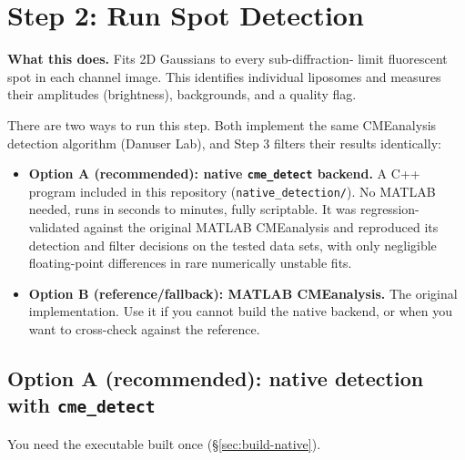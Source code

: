 \documentclass[11pt]{article}
\newcommand{\code}[1]{\texttt{#1}}
\begin{document}
\section{Step 2: Run Spot Detection}

\textbf{What this does.} Fits 2D Gaussians to every sub-diffraction-
limit fluorescent spot in each channel image. This identifies
individual liposomes and measures their amplitudes (brightness),
backgrounds, and a quality flag.

There are two ways to run this step. Both implement the same
CMEanalysis detection algorithm (Danuser Lab), and Step 3 filters
their results identically:

\begin{itemize}[leftmargin=*]
    \item \textbf{Option A (recommended): native \code{cme\_detect}
    backend.} A C++ program included in this repository
    (\code{native\_detection/}). No MATLAB needed, runs in seconds to
    minutes, fully scriptable. It was regression-validated against
    the original MATLAB CMEanalysis and reproduced its detection and
    filter decisions on the tested data sets, with only negligible
    floating-point differences in rare numerically unstable fits.
    \item \textbf{Option B (reference/fallback): MATLAB CMEanalysis.}
    The original implementation. Use it if you cannot build the native
    backend, or when you want to cross-check against the reference.
\end{itemize}

\subsection*{Option A (recommended): native detection with \code{cme\_detect}}

You need the executable built once (\S\ref{sec:build-native}).
\end{document}
